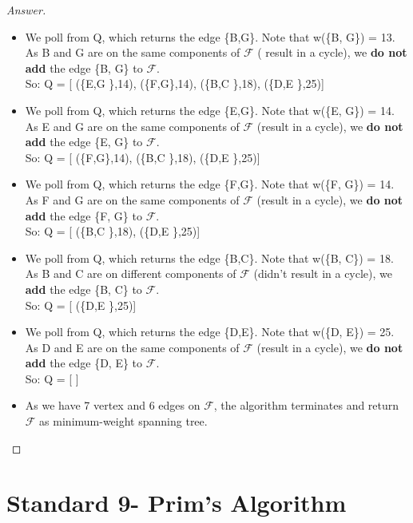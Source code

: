 \documentclass[11pt]{article}
\theoremstyle{definition}
\theoremstyle{definition}
\theoremstyle{definition}
\begin{document}
\begin{proof}[Answer]
\begin{itemize}
\item We poll from Q, which returns the edge \{B,G\}. Note that w(\{B, G\}) = 13. As B and G are on the same
components of $\mathcal{F}$ ( result in a cycle), we \textbf{do not add}  the edge \{B, G\} to $\mathcal{F}$.\\
So: Q = [ (\{E,G \},14), (\{F,G\},14), (\{B,C \},18), (\{D,E \},25)]

\item We poll from Q, which returns the edge \{E,G\}. Note that w(\{E, G\}) = 14. As E and G are on the same
components of $\mathcal{F}$ (result in a cycle), we \textbf{do not add} the edge \{E, G\} to $\mathcal{F}$.\\
So: Q = [ (\{F,G\},14), (\{B,C \},18), (\{D,E \},25)]

\item We poll from Q, which returns the edge \{F,G\}. Note that w(\{F, G\}) = 14. As F and G are on the same
components of $\mathcal{F}$ (result in a cycle), we \textbf{do not add} the edge \{F, G\} to $\mathcal{F}$.\\
So: Q = [ (\{B,C \},18), (\{D,E \},25)]


\item We poll from Q, which returns the edge \{B,C\}. Note that w(\{B, C\}) = 18. As B and C are on different
components of $\mathcal{F}$ (didn't result in a cycle), we \textbf{add} the edge \{B, C\} to $\mathcal{F}$.\\
So: Q = [ (\{D,E \},25)]

\item We poll from Q, which returns the edge \{D,E\}. Note that w(\{D, E\}) = 25. As D and E are on the same
components of $\mathcal{F}$ (result in a cycle), we \textbf{do not add} the edge \{D, E\} to $\mathcal{F}$.\\
So: Q = [ ]
\item As we have 7 vertex and 6 edges on $\mathcal{F}$, the algorithm terminates and return $\mathcal{F}$ as minimum-weight spanning tree. 
\end{itemize}
\end{proof}



\newpage
\section{Standard 9- Prim's Algorithm}
\end{document}
